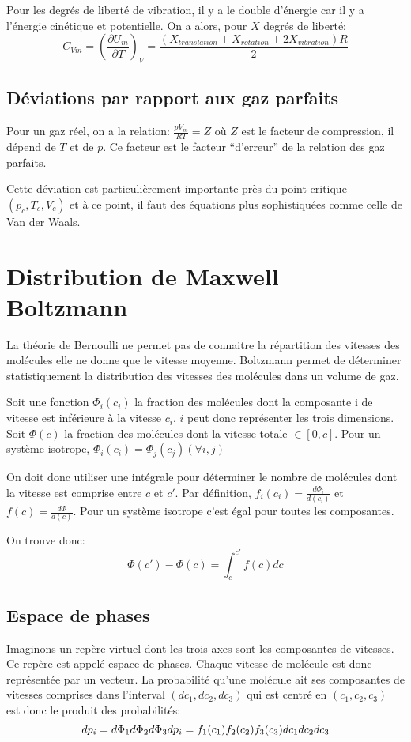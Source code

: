 Pour les degrés de liberté de vibration, il y a le double d'énergie car il y a l'énergie cinétique et potentielle.
On a alors, pour $X$ degrés de liberté:
$$ C_{Vm} = (\frac{\partial U_m}{\partial T})_V = \frac{(X_{translation} + X_{rotation} + 2X_{vibration})R}{2}$$ 

\subsection{Déviations par rapport aux gaz parfaits}
Pour un gaz réel, on a la relation: $\frac{pV_m}{RT} = Z$ où $Z$ est le facteur de compression, il dépend de $T$ et de $p$. Ce facteur est le facteur ``d'erreur'' de la relation des gaz parfaits.

Cette déviation est particulièrement importante près du point critique $(p_c, T_c, V_c)$ et à ce point, il faut des équations plus sophistiquées comme celle de Van der Waals.

\section{Distribution de Maxwell Boltzmann}
La théorie de Bernoulli ne permet pas de connaitre la répartition des vitesses des molécules elle ne donne que le vitesse moyenne. Boltzmann permet de déterminer statistiquement la distribution des vitesses des molécules dans un volume de gaz.

Soit une fonction $\Phi_i(c_i)$ la fraction des molécules dont la composante i de vitesse est inférieure à la vitesse $c_i$, $i$ peut donc représenter les trois dimensions.
Soit $\Phi(c)$ la fraction des molécules dont la vitesse totale $\in [0, c]$.
Pour un système isotrope, $\Phi_i(c_i) = \Phi_j(c_j) (\forall i, j)$


On doit donc utiliser une intégrale pour déterminer le nombre de molécules dont la vitesse est comprise entre $c$ et $c'$.
Par définition, $f_i(c_i) = \frac{d\Phi_i}{d(c_i)}$ et $f(c) = \frac{d\Phi}{d(c)}$. Pour un système isotrope c'est égal pour toutes les composantes.

On trouve donc: $$\Phi(c') - \Phi(c) = \int_{c}^{c'}{f(c)dc}$$

\subsection{Espace de phases}
Imaginons un repère virtuel dont les trois axes sont les composantes de vitesses. Ce repère est appelé espace de phases. Chaque vitesse de molécule est donc représentée par un vecteur.
La probabilité qu'une molécule ait ses composantes de vitesses comprises dans l'interval $(dc_1, dc_2, dc_3)$ qui est centré en $(c_1, c_2, c_3)$ est donc le produit des probabilités:
$$
dp_i = d\Phi_1 d\Phi_2 d\Phi_3 \\
dp_i = f_1(c_1)f_2(c_2)f_3(c_3)dc_1 dc_2 dc_3 \\
$$

